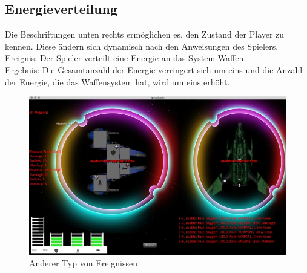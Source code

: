 \documentclass[12pt]{article}
\begin{document}
\subsection{Energieverteilung}
Die Beschriftungen unten rechts ermöglichen es, den Zustand der Player zu kennen. Diese ändern sich dynamisch nach den Anweisungen des Spielers.\\
Ereignis: Der Spieler verteilt eine Energie an das System Waffen.\\
Ergebnis: Die Gesamtanzahl der Energie verringert sich um eins und die Anzahl der Energie, die das Waffensystem hat, wird um eins erhöht.\\
\begin{figure}[htp]
\centering
\includegraphics[scale=0.7]{TestProtocolBilder/OptimizedEnergieAlleSysteme.png}
\caption{Anderer Typ von Ereignissen}
\end{figure}

\newpage
\end{document}

